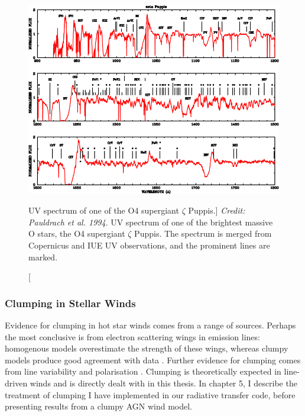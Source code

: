 \begin{figure}
\centering
\includegraphics[width=1.0\textwidth]{figures/02-outflows/hot_star_wind.png}
\caption
[UV spectrum of one of the O4 supergiant $\zeta$ Puppis.]
{
{\sl Credit: Pauldrach et al. 1994}. 
UV spectrum of one of the brightest massive O stars, 
the O4 supergiant $\zeta$ Puppis. The spectrum is merged from 
Copernicus and IUE UV observations, and the prominent lines are 
marked.
} 
\label{fig:hot_star_wind}
\end{figure}

\subsubsection{Clumping in Stellar Winds}

\label{sec:clumpy_stellar}

Evidence for clumping in hot star winds comes from a range of sources.
Perhaps the most conclusive is from electron scattering wings
in emission lines: homogenous models overestimate the strength of these
wings, whereas clumpy models produce good agreement with data 
\citep{hillier1984,hillier1991eswingsmodel,hamann1992wr,hamann1994,schmutz1997}.
Further evidence for clumping comes from line variability \citep{prinja1992}
and polarisation \citep{brown1995}. Clumping is theoretically expected
in line-driven winds 
\citep[see section~\ref{sec:line_driving} and the review by][]{owocki2014} 
and is directly dealt with in this thesis.
In chapter 5, I describe the treatment of clumping I have implemented 
in our radiative transfer code, before presenting
results from a clumpy AGN wind model.

